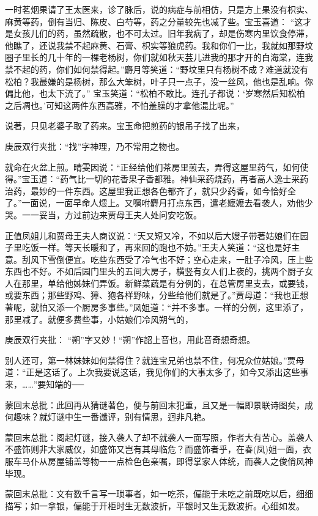 \begin{parag}
    一时茗烟果请了王太医来，诊了脉后，说的病症与前相仿，只是方上果没有枳实、麻黄等药，倒有当归、陈皮、白芍等，药之分量较先也减了些。宝玉喜道： “这才是女孩儿们的药，虽然疏散，也不可太过。旧年我病了，却是伤寒内里饮食停滞，他瞧了，还说我禁不起麻黄、石膏、枳实等狼虎药。我和你们一比，我就如那野坟圈子里长的几十年的一棵老杨树，你们就如秋天芸儿进我的那才开的白海棠，连我禁不起的药，你们如何禁得起。”麝月等笑道：“野坟里只有杨树不成？难道就没有松柏？我最嫌的是杨树，那么大笨树，叶子只一点子，没一丝风，他也是乱响。你偏比他，也太下流了。” 宝玉笑道：“松柏不敢比。连孔子都说：‘岁寒然后知松柏之后凋也。’可知这两件东西高雅，不怕羞臊的才拿他混比呢。”
\end{parag}


\begin{parag}
    说著，只见老婆子取了药来。宝玉命把煎药的银吊子找了出来，\begin{note}庚辰双行夹批：“找”字神理，乃不常用之物也。\end{note}就命在火盆上煎。晴雯因说：“正经给他们茶房里煎去，弄得这屋里药气，如何使得。”宝玉道：“药气比一切的花香果子香都雅。神仙采药烧药，再者高人逸士采药治药，最妙的一件东西。这屋里我正想各色都齐了，就只少药香，如今恰好全了。”一面说，一面早命人煨上。又嘱咐麝月打点东西，遣老嬷嬷去看袭人，劝他少哭。一一妥当，方过前边来贾母王夫人处问安吃饭。
\end{parag}


\begin{parag}
    正值凤姐儿和贾母王夫人商议说：“天又短又冷，不如以后大嫂子带著姑娘们在园子里吃饭一样。等天长暖和了，再来回的跑也不妨。”王夫人笑道：“这也是好主意。刮风下雪倒便宜。吃些东西受了冷气也不好；空心走来，一肚子冷风，压上些东西也不好。不如后园门里头的五间大房子，横竖有女人们上夜的，挑两个厨子女人在那里，单给他姊妹们弄饭。新鲜菜蔬是有分例的，在总管房里支去，或要钱，或要东西；那些野鸡、獐、狍各样野味，分些给他们就是了。”贾母道：“我也正想著呢，就怕又添一个厨房多事些。”凤姐道：“并不多事。一样的分例，这里添了，那里减了。就便多费些事，小姑娘们冷风朔气的，\begin{note}庚辰双行夹批： “朔”字又妙！“朔”作韶上音也，用此音奇想奇想。\end{note}别人还可，第一林妹妹如何禁得住？就连宝兄弟也禁不住，何况众位姑娘。”贾母道：“正是这话了。上次我要说这话，我见你们的大事太多了，如今又添出这些事来，……”要知端的──
\end{parag}


\begin{parag}
    \begin{note}蒙回末总批：此回再从猜谜著色，便与前回末犯重，且又是一幅即景联诗图矣，成何趣味？就灯谜中生一番谶评，别有情思，迥非凡艳。\end{note}
\end{parag}


\begin{parag}
    \begin{note}蒙回末总批：阁起灯谜，接入袭人了却不就袭人一面写照，作者大有苦心。盖袭人不盛饰则非大家威仪，如盛饰又岂有其母临危？而盛饰者乎，在春(凤)姐一面，衣服车马仆从房屋铺盖等物一一点检色色亲嘱，即得掌家人体统，而袭人之俊俏风神毕现。\end{note}
\end{parag}


\begin{parag}
    \begin{note}蒙回末总批：文有数千言写一琐事者，如一吃茶，偏能于未吃之前既吃以后，细细描写；如一拿银，偏能于开柜时生无数波折，平银时又生无数波折。心细如发。\end{note}
\end{parag}
